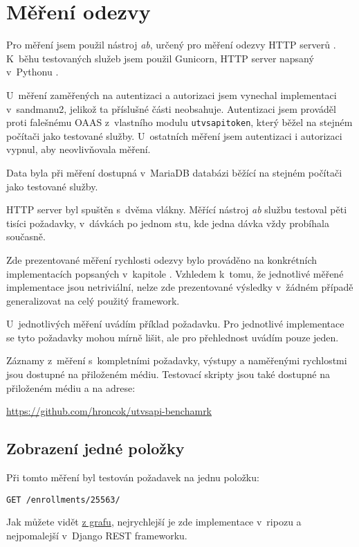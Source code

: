 \chapter{Měření odezvy \label{mereni}}

Pro měření jsem použil nástroj \emph{ab}, určený pro měření odezvy HTTP serverů \autocite{ab}. K~běhu testovaných služeb jsem použil Gunicorn, HTTP server napsaný v~Pythonu \autocite{gunicorn}.

U~měření zaměřených na autentizaci a autorizaci jsem vynechal implementaci v~sandmanu2, jelikož ta příslušné části neobsahuje. Autentizaci jsem prováděl proti falešnému OAAS z~vlastního modulu \verb!utvsapitoken!, který běžel na stejném počítači jako testované služby. U~ostatních měření jsem autentizaci i autorizaci vypnul, aby neovlivňovala měření.

Data byla při měření dostupná v~MariaDB databázi běžící na stejném počítači jako testované služby.

HTTP server byl spuštěn s~dvěma vlákny. Měřící nástroj \emph{ab} službu testoval pěti tisíci požadavky, v~dávkách po jednom stu, kde jedna dávka vždy probíhala současně.

Zde prezentované měření rychlosti odezvy bylo prováděno na konkrétních implementacích popsaných v~kapitole \emph{}. Vzhledem k~tomu, že jednotlivé měřené implementace jsou netriviální, nelze zde prezentované výsledky v~žádném případě generalizovat na celý použitý framework.

U~jednotlivých měření uvádím příklad požadavku. Pro jednotlivé implementace se tyto požadavky mohou mírně lišit, ale pro přehlednost uvádím pouze jeden.

Záznamy z~měření s~kompletními požadavky, výstupy a naměřenými rychlostmi jsou dostupné na přiloženém médiu. Testovací skripty jsou také dostupné na přiloženém médiu a na adrese:

\url{https://github.com/hroncok/utvsapi-benchamrk}

\section{Zobrazení jedné položky}\label{zobrazenuxed-jednuxe9-poloux17eky}

Při tomto měření byl testován požadavek na jednu položku:

\verb!GET /enrollments/25563/!

Jak můžete vidět \protect\hyperlink{pic:item:chart}{z grafu}, nejrychlejší je zde implementace v~ripozu a nejpomalejší v~Django REST frameworku.

